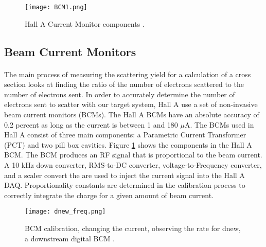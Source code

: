 		  	\begin{figure}[t]
  	 	 		\centering
  	 	 		\texttt{[image: BCM1.png]} 
  	 	 		\caption{Hall A Current Monitor components \cite{BCM1}.\label{BCMpng}}
		  	\end{figure}
	\subsection{Beam Current Monitors}
	\paragraph{} The main process of measuring the scattering yield for a calculation of a cross section looks at finding the ratio of the number of electrons scattered to the number of electrons sent. In order to accurately determine the number of electrons sent to scatter with our target system, Hall A use a set of non-invasive beam current monitors (BCMs). The Hall A BCMs have an absolute accuracy of 0.2 percent as long as the current is between 1 and 180 $\mu$A. The BCMs used in Hall A consist of three main components: a Parametric Current Transformer (PCT) and two pill box cavities. Figure \ref{BCMpng} shows the components in the Hall A BCM.  The BCM produces an RF signal that is proportional to the beam current. A 10 kHz down converter, RMS-to-DC converter, voltage-to-Frequency converter, and a scaler convert the are used to inject the current signal into the Hall A DAQ. Proportionality constants are determined in the calibration process to correctly integrate the charge for a given amount of beam current\cite{BCM1}.
	\begin{figure}[t]
		\centering
		\texttt{[image: dnew\_freq.png]}
		\caption{BCM calibration, changing the current, observing the rate for dnew, a downstream digital BCM \cite{MikeTh}.
		\label{dnewfreq}}
	\end{figure}

